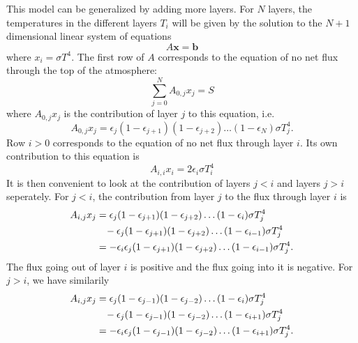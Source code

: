 \documentclass[twocolumn]{article}
\begin{document}
\begin{large}
This model can be generalized by adding more layers. For $N$ layers, the temperatures in the different layers $T_i$ will be given by the solution to the $N+1$ dimensional linear system of equations
\begin{equation}
    A\mathbf{x} = \mathbf{b}
\end{equation}
where $x_i = \sigma T^4$. The first row of $A$ corresponds to the equation of no net flux through the top of the atmosphere:
\begin{equation}
    \sum_{j=0}^{N}A_{0,j}x_j = S
\end{equation}
where $A_{0,j}x_j$ is the contribution of layer $j$ to this equation, i.e.
\begin{equation}
    A_{0,j}x_j = \epsilon_j(1-\epsilon_{j+1})(1-\epsilon_{j+2})\dots(1-\epsilon_{N})\sigma T_j^4.
\end{equation}
Row $i>0$ corresponds to the equation of no net flux through layer $i$. Its own contribution to this equation is
\begin{equation}
    A_{i,i}x_i = 2\epsilon_i\sigma T_i^4
\end{equation}
It is then convenient to look at the contribution of layers $j<i$ and layers $j>i$ seperately. For $j<i$, the contribution from layer $j$ to the flux through layer $i$ is 
\begin{equation}
    \begin{split}
        A_{i,j}x_j &= \epsilon_j(1-\epsilon_{j+1})(1-\epsilon_{j+2})\dots(1-\epsilon_{i})\sigma T_j^4 \\ 
        &\hspace{0.3cm} -\epsilon_j(1-\epsilon_{j+1})(1-\epsilon_{j+2})\dots(1-\epsilon_{i-1})\sigma T_j^4 \\ 
        &= -\epsilon_i\epsilon_j(1-\epsilon_{j+1})(1-\epsilon_{j+2})\dots(1-\epsilon_{i-1})\sigma T_j^4.
    \end{split}
\end{equation}
The flux going out of layer $i$ is positive and the flux going into it is negative. For $j>i$, we have similarily
\begin{equation}
    \begin{split}
        A_{i,j}x_j &= \epsilon_j(1-\epsilon_{j-1})(1-\epsilon_{j-2})\dots(1-\epsilon_{i})\sigma T_j^4 \\ 
        &\hspace{0.3cm} -\epsilon_j(1-\epsilon_{j-1})(1-\epsilon_{j-2})\dots(1-\epsilon_{i+1})\sigma T_j^4 \\ 
        &= -\epsilon_i\epsilon_j(1-\epsilon_{j-1})(1-\epsilon_{j-2})\dots(1-\epsilon_{i+1})\sigma T_j^4.

\end{split}
\end{equation}
\end{large}
\end{document}
